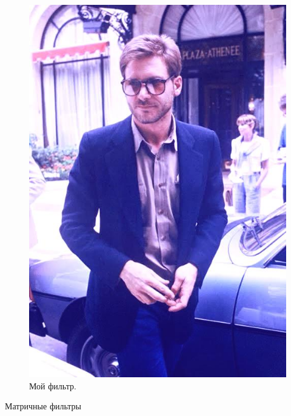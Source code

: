 \documentclass[a4paper,12pt]{article}
\begin{document}
\begin{figure}[h]
\begin{minipage}[h]{0.2\linewidth}
\includegraphics[width=1\linewidth]{Pic_MyFilter}
Мой фильтр.
\end{minipage}

\end{figure}


\newpage
\begin{center}
Матричные фильтры
\end{center}
\vspace{5mm}
\end{document}

